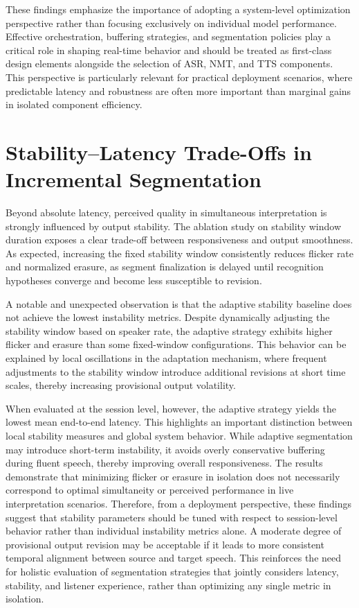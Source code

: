 These findings emphasize the importance of adopting a system-level optimization perspective rather than focusing exclusively on individual model performance. Effective orchestration, buffering strategies, and segmentation policies play a critical role in shaping real-time behavior and should be treated as first-class design elements alongside the selection of ASR, NMT, and TTS components. This perspective is particularly relevant for practical deployment scenarios, where predictable latency and robustness are often more important than marginal gains in isolated component efficiency.


\section{Stability--Latency Trade-Offs in Incremental Segmentation}

Beyond absolute latency, perceived quality in simultaneous interpretation is strongly influenced by output stability. The ablation study on stability window duration exposes a clear trade-off between responsiveness and output smoothness. As expected, increasing the fixed stability window consistently reduces flicker rate and normalized erasure, as segment finalization is delayed until recognition hypotheses converge and become less susceptible to revision.

A notable and unexpected observation is that the adaptive stability baseline does not achieve the lowest instability metrics. Despite dynamically adjusting the stability window based on speaker rate, the adaptive strategy exhibits higher flicker and erasure than some fixed-window configurations. This behavior can be explained by local oscillations in the adaptation mechanism, where frequent adjustments to the stability window introduce additional revisions at short time scales, thereby increasing provisional output volatility.

When evaluated at the session level, however, the adaptive strategy yields the lowest mean end-to-end latency. This highlights an important distinction between local stability measures and global system behavior. While adaptive segmentation may introduce short-term instability, it avoids overly conservative buffering during fluent speech, thereby improving overall responsiveness. The results demonstrate that minimizing flicker or erasure in isolation does not necessarily correspond to optimal simultaneity or perceived performance in live interpretation scenarios. Therefore, from a deployment perspective, these findings suggest that stability parameters should be tuned with respect to session-level behavior rather than individual instability metrics alone. A moderate degree of provisional output revision may be acceptable if it leads to more consistent temporal alignment between source and target speech. This reinforces the need for holistic evaluation of segmentation strategies that jointly considers latency, stability, and listener experience, rather than optimizing any single metric in isolation.


